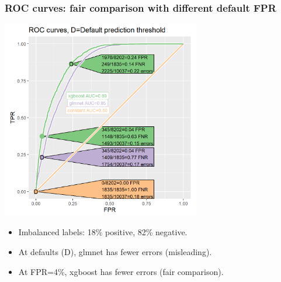 \documentclass[t]{beamer}
\begin{document}
\begin{frame}
  \frametitle{ROC curves: fair comparison with different default FPR}

  \includegraphics[width=0.65\textwidth]{figure-batchtools-expired-earth-roc}

  \begin{itemize}
  \item Imbalanced labels: 18\% positive, 82\% negative.
  \item At defaults (D), glmnet has fewer errors (misleading).
  \item At FPR=4\%, xgboost has fewer errors (fair comparison).
  \end{itemize}
\end{frame}
\end{document}
